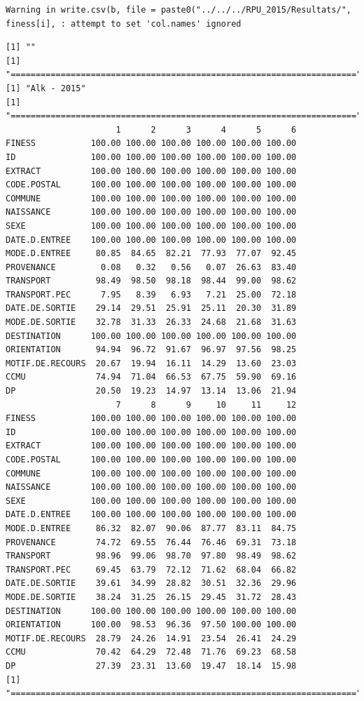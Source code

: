 \documentclass[]{article}
\begin{document}
\begin{verbatim}
Warning in write.csv(b, file = paste0("../../../RPU_2015/Resultats/",
finess[i], : attempt to set 'col.names' ignored
\end{verbatim}

\begin{verbatim}
[1] ""
[1] "====================================================================="
[1] "Alk - 2015"
[1] "====================================================================="
                      1      2      3      4      5      6
FINESS           100.00 100.00 100.00 100.00 100.00 100.00
ID               100.00 100.00 100.00 100.00 100.00 100.00
EXTRACT          100.00 100.00 100.00 100.00 100.00 100.00
CODE.POSTAL      100.00 100.00 100.00 100.00 100.00 100.00
COMMUNE          100.00 100.00 100.00 100.00 100.00 100.00
NAISSANCE        100.00 100.00 100.00 100.00 100.00 100.00
SEXE             100.00 100.00 100.00 100.00 100.00 100.00
DATE.D.ENTREE    100.00 100.00 100.00 100.00 100.00 100.00
MODE.D.ENTREE     80.85  84.65  82.21  77.93  77.07  92.45
PROVENANCE         0.08   0.32   0.56   0.07  26.63  83.40
TRANSPORT         98.49  98.50  98.18  98.44  99.00  98.62
TRANSPORT.PEC      7.95   8.39   6.93   7.21  25.00  72.18
DATE.DE.SORTIE    29.14  29.51  25.91  25.11  20.30  31.89
MODE.DE.SORTIE    32.78  31.33  26.33  24.68  21.68  31.63
DESTINATION      100.00 100.00 100.00 100.00 100.00 100.00
ORIENTATION       94.94  96.72  91.67  96.97  97.56  98.25
MOTIF.DE.RECOURS  20.67  19.94  16.11  14.29  13.60  23.03
CCMU              74.94  71.04  66.53  67.75  59.90  69.16
DP                20.50  19.23  14.97  13.14  13.06  21.94
                      7      8      9     10     11     12
FINESS           100.00 100.00 100.00 100.00 100.00 100.00
ID               100.00 100.00 100.00 100.00 100.00 100.00
EXTRACT          100.00 100.00 100.00 100.00 100.00 100.00
CODE.POSTAL      100.00 100.00 100.00 100.00 100.00 100.00
COMMUNE          100.00 100.00 100.00 100.00 100.00 100.00
NAISSANCE        100.00 100.00 100.00 100.00 100.00 100.00
SEXE             100.00 100.00 100.00 100.00 100.00 100.00
DATE.D.ENTREE    100.00 100.00 100.00 100.00 100.00 100.00
MODE.D.ENTREE     86.32  82.07  90.06  87.77  83.11  84.75
PROVENANCE        74.72  69.55  76.44  76.46  69.31  73.18
TRANSPORT         98.96  99.06  98.70  97.80  98.49  98.62
TRANSPORT.PEC     69.45  63.79  72.12  71.62  68.04  66.82
DATE.DE.SORTIE    39.61  34.99  28.82  30.51  32.36  29.96
MODE.DE.SORTIE    38.24  31.25  26.15  29.45  31.72  28.43
DESTINATION      100.00 100.00 100.00 100.00 100.00 100.00
ORIENTATION      100.00  98.53  96.36  97.50 100.00 100.00
MOTIF.DE.RECOURS  28.79  24.26  14.91  23.54  26.41  24.29
CCMU              70.42  64.29  72.48  71.76  69.23  68.58
DP                27.39  23.31  13.60  19.47  18.14  15.98
[1] "====================================================================="
\end{verbatim}
\end{document}
